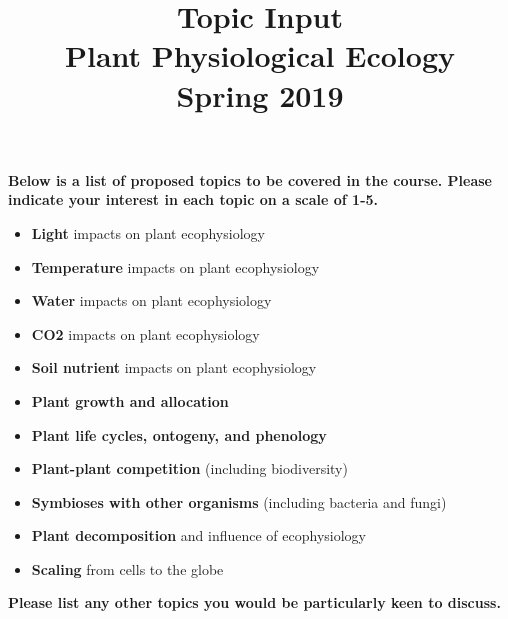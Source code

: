 \documentclass[12pt, notitlepage]{article}   	%
\title{
	\textbf{
		Topic Input
	} \\
	\large{Plant Physiological Ecology} \\
	\large{Spring 2019}
}
\date{\vspace{-5ex}}
\begin{document}
{\selectfont %

\maketitle

\textbf{Below is a list of proposed topics to be covered in the course.
Please indicate your interest in each topic on a scale of 1-5.}

\small{
\begin{itemize}
	\item{\underline{\hspace{1cm}} \textbf{Light} impacts on plant ecophysiology}
	\item{\underline{\hspace{1cm}} \textbf{Temperature} impacts on plant ecophysiology}
	\item{\underline{\hspace{1cm}} \textbf{Water} impacts on plant ecophysiology}
	\item{\underline{\hspace{1cm}} \textbf{CO2} impacts on plant ecophysiology}
	\item{\underline{\hspace{1cm}} \textbf{Soil nutrient} impacts on plant ecophysiology}
	\item{\underline{\hspace{1cm}} \textbf{Plant growth and allocation}}
	\item{\underline{\hspace{1cm}} \textbf{Plant life cycles, ontogeny, and phenology}}
	\item{\underline{\hspace{1cm}} \textbf{Plant-plant competition} 
	(including biodiversity)}
	\item{\underline{\hspace{1cm}} \textbf{Symbioses with other organisms}
	(including bacteria and fungi)}
	\item{\underline{\hspace{1cm}} \textbf{Plant decomposition} and influence of
	ecophysiology}
	\item{\underline{\hspace{1cm}} \textbf{Scaling} from cells to the globe}
\end{itemize}
}

\textbf{Please list any other topics you would be particularly keen to discuss.}

} %
\end{document}

